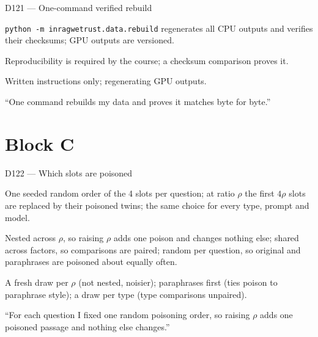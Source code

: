 \documentclass[11pt,a4paper]{report}
\begin{document}
\begin{decisionbox}{D121 --- One-command verified rebuild}
\begin{description}[nosep, leftmargin=0pt]
  \item[Decision.] \texttt{python -m inragwetrust.data.rebuild} regenerates all CPU outputs and verifies their checksums; GPU outputs are versioned.
  \item[Why.] Reproducibility is required by the course; a checksum comparison proves it.
  \item[Alternatives.] Written instructions only; regenerating GPU outputs.
  \item[Interview line.] ``One command rebuilds my data and proves it matches byte for byte.''
\end{description}
\end{decisionbox}

\section{Block C}\label{sec:decisions-c}

\begin{decisionbox}{D122 --- Which slots are poisoned}
\begin{description}[nosep, leftmargin=0pt]
  \item[Decision.] One seeded random order of the 4 slots per question; at ratio $\rho$ the first $4\rho$ slots are replaced by their poisoned twins; the same choice for every type, prompt and model.
  \item[Why.] Nested across $\rho$, so raising $\rho$ adds one poison and changes nothing else; shared across factors, so comparisons are paired; random per question, so original and paraphrases are poisoned about equally often.
  \item[Alternatives.] A fresh draw per $\rho$ (not nested, noisier); paraphrases first (ties poison to paraphrase style); a draw per type (type comparisons unpaired).
  \item[Interview line.] ``For each question I fixed one random poisoning order, so raising $\rho$ adds one poisoned passage and nothing else changes.''
\end{description}
\end{decisionbox}
\end{document}
